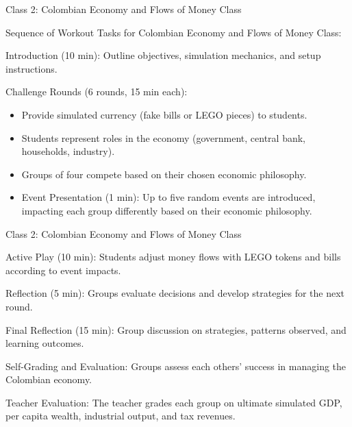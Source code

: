 \documentclass[
  ignorenonframetext,
]{beamer}
\providecommand{\tightlist}{%
  \setlength{\itemsep}{0pt}\setlength{\parskip}{0pt}}
\begin{document}
\begin{frame}{Class 2: Colombian Economy and Flows of Money Class}
\label{class-2-colombian-economy-and-flows-of-money-class}
\small

Sequence of Workout Tasks for Colombian Economy and Flows of Money
Class:

Introduction (10 min): Outline objectives, simulation mechanics, and
setup instructions.

Challenge Rounds (6 rounds, 15 min each):

\begin{itemize}
\tightlist
\item
  Provide simulated currency (fake bills or LEGO pieces) to students.
\item
  Students represent roles in the economy (government, central bank,
  households, industry).
\item
  Groups of four compete based on their chosen economic philosophy.
\item
  Event Presentation (1 min): Up to five random events are introduced,
  impacting each group differently based on their economic philosophy.
\end{itemize}
\end{frame}

\begin{frame}{Class 2: Colombian Economy and Flows of Money Class}
\label{class-2-colombian-economy-and-flows-of-money-class-1}
\small

Active Play (10 min): Students adjust money flows with LEGO tokens and
bills according to event impacts.

Reflection (5 min): Groups evaluate decisions and develop strategies for
the next round.

Final Reflection (15 min): Group discussion on strategies, patterns
observed, and learning outcomes.

Self-Grading and Evaluation: Groups assess each others' success in
managing the Colombian economy.

Teacher Evaluation: The teacher grades each group on ultimate simulated
GDP, per capita wealth, industrial output, and tax revenues.
\end{frame}
\end{document}

